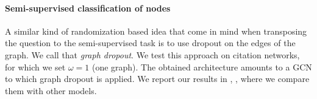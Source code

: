 \paragraph{Semi-supervised classification of nodes}

A similar kind of randomization based idea that come in mind when transposing the question to the semi-supervised task is to use dropout on the edges of the graph. We call that \emph{graph dropout}. We test this approach on citation networks, for which we set $\omega = 1$ (\ie one graph). The obtained architecture amounts to a GCN \citep{kipf2016semi} to which graph dropout is applied. We report our results in , , where we compare them with other models.





